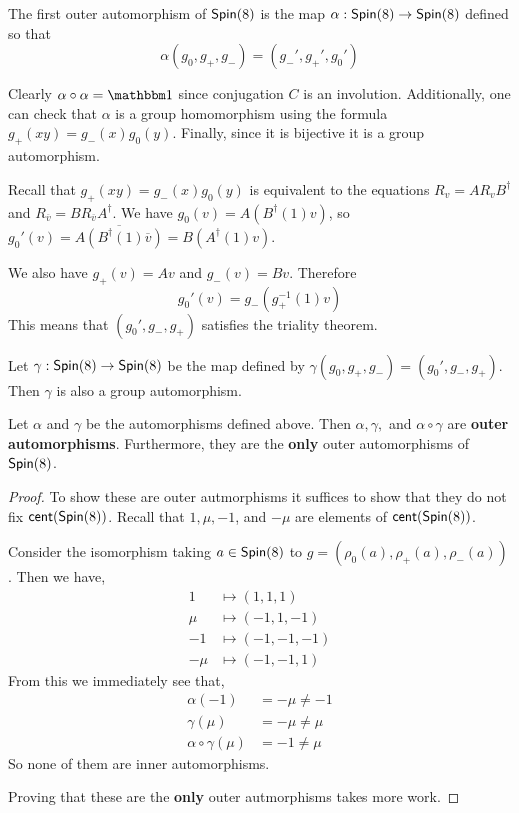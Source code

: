 \begin{defn}
The first outer automorphism of $\operatorname{\textsf{Spin}}(8)$ is the map $\alpha : \operatorname{\textsf{Spin}}(8)\to \operatorname{\textsf{Spin}}(8)$ defined so that
\[\alpha(g_0,g_+,g_-)=(g_-',g_+',g_0')\]
\end{defn}
\begin{remark*}
    Clearly $\alpha\circ\alpha = \One$ since conjugation $C$ is an involution. Additionally, one can check that $\alpha$ is a group homomorphism using the formula $g_+(xy)=g_-(x)g_0(y)$. Finally, since it is bijective it is a group automorphism.
\end{remark*}
\begin{remark*}
    Recall that $g_+(xy)=g_-(x)g_0(y)$ is equivalent to the equations $R_v = A R_v B^\dagger$ and $R_{\overline{v}} = BR_{\overline{v}}A^\dagger$. We have $g_0(v) = A(B^\dagger(1)v)$, so $g_0'(v) = \overline{A(B^\dagger(1)\overline{v})} = B(A^\dagger(1)v)$. 

    We also have $g_+(v) = Av$ and $g_-(v) = Bv$. Therefore
    \[g_0'(v) = g_-(g_+^{-1}(1)v)\]
    This means that $(g_0', g_-,g_+)$ satisfies the triality theorem.
\end{remark*}
\begin{defn}
Let $\gamma : \operatorname{\textsf{Spin}}(8)\to \operatorname{\textsf{Spin}}(8)$ be the map defined by $\gamma(g_0,g_+,g_-) = (g_0',g_-,g_+)$. Then $\gamma$ is also a group automorphism.
\end{defn}
\begin{thm}
Let $\alpha$ and $\gamma$ be the automorphisms defined above. Then $\alpha, \gamma,$ and $\alpha\circ\gamma$ are \textbf{outer automorphisms}. Furthermore, they are the \textbf{only} outer automorphisms of $\operatorname{\textsf{Spin}}(8)$.
\end{thm}
\begin{proof}
To show these are outer autmorphisms it suffices to show that they do not fix $\operatorname{\textsf{cent}}(\operatorname{\textsf{Spin}}(8))$. Recall that $1,\mu,-1$, and $-\mu$ are elements of $\operatorname{\textsf{cent}}(\operatorname{\textsf{Spin}}(8))$.

Consider the isomorphism taking $a \in \operatorname{\textsf{Spin}}(8)$ to $g=(\rho_0(a),\rho_+(a),\rho_-(a))$. Then we have,
\begin{align*}
    1&\mapsto (1,1,1)\\
    \mu&\mapsto (-1,1,-1)\\
    -1&\mapsto (-1,-1,-1)\\
    -\mu&\mapsto (-1,-1,1)
\end{align*}
From this we immediately see that,
\begin{align*}
    \alpha(-1)&=-\mu \neq -1\\
    \gamma(\mu)&=-\mu \neq \mu\\
    \alpha\circ\gamma(\mu)&=-1\neq \mu
\end{align*}
So none of them are inner automorphisms.

Proving that these are the \textbf{only} outer autmorphisms takes more work.
\end{proof}

